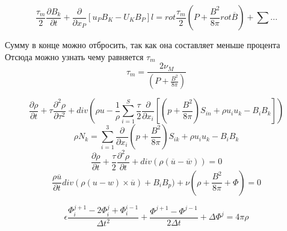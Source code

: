 \documentclass{article}
\begin{document}
\[ \frac{\tau_m}{2} \frac{\partial B_k}{\partial t} + \frac{\partial }{\partial x_P} [u_P B_K - U_K B_P]l = rot \frac{\tau_m}{2} (P + \frac{B^2}{8 \pi} rot \overline{B}) + \sum_{}^{} ... \]

Сумму в конце можно отбросить, так как она составляет меньше процента
Отсюда можно узнать чему равняется $ \tau_m $
\[ \tau_m = \frac{2\nu_M}{(P + \frac{B^2}{8 \pi})} \]

\[ \frac{\partial \rho}{\partial t} + \tau \frac{\partial ^2 \rho}{\partial  \tau^2} + div( \rho u - \frac{1}{\rho} \sum_{i=1}^{S} \frac{\tau}{2} \frac{\partial }{\partial x_i} [ (p + \frac{B^2}{8 \pi}) S_{in} + \rho u_i u_k - B_i B_k]) \]
\[ \rho N_k = \sum_{i=1}^{3} \frac{\partial }{\partial x_i} (p + \frac{B^2}{8 \pi}) S_{ik} + \rho u_i u_k - B_i B_k \]
\[ \frac{\partial \rho}{\partial t} + \frac{\tau}{2} \frac{\partial ^2 \rho}{\partial t} + div (\rho (\overline{u} - \overline{w})) = 0  \]
\[ \frac{\rho \overline{u}}{\partial t} div (\rho (u - w) \times \overline{u}) + B_i B_p) + \nu ( \rho + \frac{B^2}{8 \pi} + \Phi) = 0  \]

\[ \epsilon \frac{\Phi_i^{j+1} - 2 \Phi_i^j + \Phi_i^{i-1}}{\Delta t^2} + \frac{\Phi^{j+1} - \Phi^{j-1}}{2 \Delta t} + \Delta \Phi^j = 4 \pi \rho\]
\end{document}
